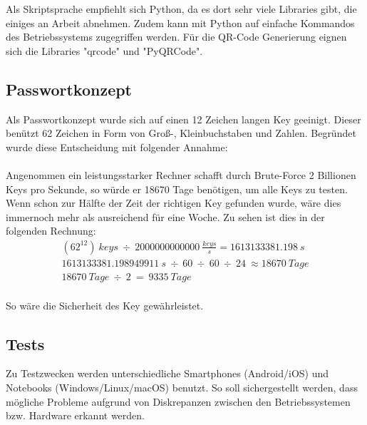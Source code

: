 \documentclass[a4paper,11pt,singlespacing]{article}
\begin{document}
			Als Skriptsprache empfiehlt sich Python, da es dort sehr viele Libraries gibt, die einiges an Arbeit abnehmen. Zudem kann mit Python auf einfache Kommandos des Betriebssystems zugegriffen werden. Für die QR-Code Generierung eignen sich die Libraries "qrcode" und "PyQRCode". 
		
		\subsection{Passwortkonzept}
			Als Passwortkonzept wurde sich auf einen 12 Zeichen langen Key geeinigt. Dieser benützt 62 Zeichen in Form von Groß-, Kleinbuchstaben und Zahlen. Begründet wurde diese Entscheidung mit folgender Annahme: \\\\
			Angenommen ein leistungsstarker Rechner schafft durch Brute-Force 2 Billionen Keys pro Sekunde, so würde er 18670 Tage benötigen, um alle Keys zu testen.  Wenn schon zur Hälfte der Zeit der richtigen Key gefunden wurde, wäre dies immernoch mehr als ausreichend für eine Woche. Zu sehen ist dies in der folgenden Rechnung:
			\begin{eqnarray}
				(62^{12})\ keys\ \div\ 2000000000000\ \frac{keys}{s} =  1613133381.198\ s\\
				1613133381.198949911\ s\ \div\ 60\ \div\ 60\ \div\ 24\ \approx 18670 \ Tage\\
				18670\ Tage\ \div\ 2\ =\ 9335\ Tage
			\end{eqnarray}\\
		    So wäre die Sicherheit des Key gewährleistet.
	
		\subsection{Tests}
			Zu Testzwecken werden unterschiedliche Smartphones (Android/iOS) und Notebooks (Windows/Linux/macOS) benutzt. So soll sichergestellt werden, dass mögliche Probleme aufgrund von Diskrepanzen zwischen den Betriebssystemen bzw. Hardware erkannt werden.
		
		
\end{document}
